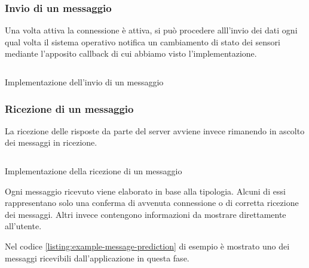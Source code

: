 \subsubsection{Invio di un messaggio}
Una volta attiva la connessione è attiva, si può procedere alll'invio dei dati ogni qual volta il sistema 
operativo notifica un cambiamento di stato dei sensori mediante l'apposito callback 
di cui abbiamo visto l'implementazione.
\begin{listing}[H] 
    \inputminted[frame=single,framesep=10pt]{java}{assets/snippets/app/connection/send.java}
    \caption{Implementazione dell'invio di un messaggio}
\end{listing}

\subsubsection{Ricezione di un messaggio}
La ricezione delle risposte da parte del server avviene invece rimanendo in ascolto 
dei messaggi in ricezione.
\begin{listing}[H] 
    \inputminted[frame=single,framesep=10pt]{java}{assets/snippets/app/connection/receive.java}
    \caption{Implementazione della ricezione di un messaggio}
\end{listing}
\vspace{5mm} %
\noindent Ogni messaggio ricevuto viene elaborato in base alla tipologia. Alcuni di essi rappresentano solo una conferma di avvenuta 
connessione o di corretta ricezione dei messaggi. Altri invece contengono informazioni da mostrare direttamente all'utente.

\vspace{5mm} %
Nel codice \ref{listing:example-message-prediction} di esempio è mostrato uno dei messaggi ricevibili dall'applicazione in questa fase.